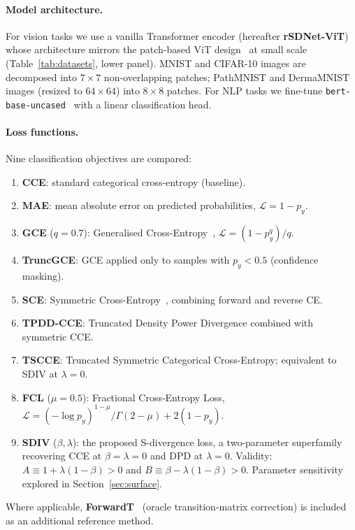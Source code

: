 \paragraph{Model architecture.}
For vision tasks we use a vanilla Transformer encoder (hereafter
\textbf{rSDNet-ViT}) whose architecture mirrors the patch-based ViT
design~\citep{dosovitskiy2021} at small scale (Table~\ref{tab:datasets}, lower panel).
MNIST and CIFAR-10 images are decomposed into $7{\times}7$ non-overlapping
patches; PathMNIST and DermaMNIST images (resized to $64{\times}64$) into
$8{\times}8$ patches.
For NLP tasks we fine-tune
\texttt{bert-base-uncased}~\citep{devlin2019} with a linear classification head.

\paragraph{Loss functions.}
Nine classification objectives are compared:
\begin{enumerate}[leftmargin=*,itemsep=2pt]
  \item \textbf{CCE}: standard categorical cross-entropy (baseline).
  \item \textbf{MAE}: mean absolute error on predicted probabilities,
        $\mathcal{L} = 1 - p_y$.
  \item \textbf{GCE} ($q{=}0.7$): Generalised Cross-Entropy~\citep{zhang2018},
        $\mathcal{L} = (1 - p_y^q)/q$.
  \item \textbf{TruncGCE}: GCE applied only to samples with $p_y < 0.5$
        (confidence masking).
  \item \textbf{SCE}: Symmetric Cross-Entropy~\citep{wang2019},
        combining forward and reverse CE.
  \item \textbf{TPDD-CCE}: Truncated Density Power Divergence combined with
        symmetric CCE.
  \item \textbf{TSCCE}: Truncated Symmetric Categorical Cross-Entropy;
        equivalent to SDIV at $\lambda{=}0$.
  \item \textbf{FCL} ($\mu{=}0.5$): Fractional Cross-Entropy Loss,
        $\mathcal{L} = (-\log p_y)^{1-\mu}/\Gamma(2{-}\mu) + 2(1-p_y)$.
  \item \textbf{SDIV} ($\beta,\lambda$): the proposed S-divergence loss,
        a two-parameter superfamily recovering CCE at $\beta{=}\lambda{=}0$
        and DPD at $\lambda{=}0$.
        Validity: $A\equiv 1+\lambda(1-\beta)>0$ and $B\equiv\beta-\lambda(1-\beta)>0$.
        Parameter sensitivity explored in Section~\ref{sec:surface}.
\end{enumerate}
Where applicable, \textbf{ForwardT}~\citep{patrini2017} (oracle transition-matrix
correction) is included as an additional reference method.

